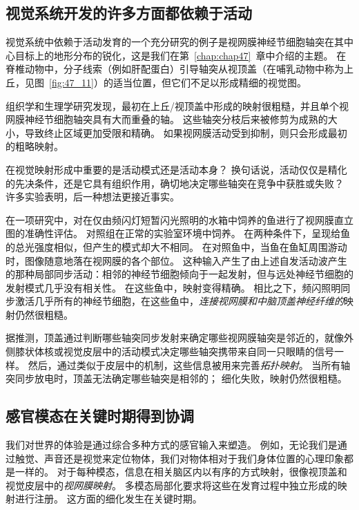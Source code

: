 \subsection{视觉系统开发的许多方面都依赖于活动}

视觉系统中依赖于活动发育的一个充分研究的例子是视网膜神经节细胞轴突在其中心目标上的地形分布的锐化，这是我们在第~\ref{chap:chap47}~章中介绍的主题。
在脊椎动物中，分子线索（例如肝配蛋白）引导轴突从视顶盖（在哺乳动物中称为上丘，见图~\ref{fig:47_11}）的适当位置，但它们不足以形成精细的视觉图。


组织学和生理学研究发现，最初在上丘/视顶盖中形成的映射很粗糙，并且单个视网膜神经节细胞轴突具有大而重叠的轴。
这些轴突分枝后来被修剪为成熟的大小，导致终止区域更加受限和精确。
如果视网膜活动受到抑制，则只会形成最初的粗略映射。


在视觉映射形成中重要的是活动模式还是活动本身？
换句话说，活动仅仅是精化的先决条件，还是它具有组织作用，确切地决定哪些轴突在竞争中获胜或失败？
许多实验表明，后一种想法更接近事实。


在一项研究中，对在仅由频闪灯短暂闪光照明的水箱中饲养的鱼进行了视网膜直立图的准确性评估。
对照组在正常的实验室环境中饲养。
在两种条件下，呈现给鱼的总光强度相似，但产生的模式却大不相同。
在对照鱼中，当鱼在鱼缸周围游动时，图像随意地落在视网膜的各个部位。
这种输入产生了由上述自发活动波产生的那种局部同步活动：相邻的神经节细胞倾向于一起发射，但与远处神经节细胞的发射模式几乎没有相关性。
在这些鱼中，映射变得精确。
相比之下，频闪照明同步激活几乎所有的神经节细胞，在这些鱼中，\textit{连接视网膜和中脑顶盖神经纤维的}映射仍然很粗糙。


据推测，顶盖通过判断哪些轴突同步发射来确定哪些视网膜轴突是邻近的，就像外侧膝状体核或视觉皮层中的活动模式决定哪些轴突携带来自同一只眼睛的信号一样。
然后，通过类似于皮层中的机制，这些信息被用来完善\textit{拓扑映射}。
当所有轴突同步放电时，顶盖无法确定哪些轴突是相邻的；
细化失败，映射仍然很粗糙。



\subsection{感官模态在关键时期得到协调}

我们对世界的体验是通过综合多种方式的感官输入来塑造。
例如，无论我们是通过触觉、声音还是视觉来定位物体，我们对物体相对于我们身体位置的心理印象都是一样的。
对于每种模态，信息在相关脑区内以有序的方式映射，很像视顶盖和视觉皮层中的\textit{视网膜映射}。
多模态局部化要求将这些在发育过程中独立形成的映射进行注册。
这方面的细化发生在关键时期。


